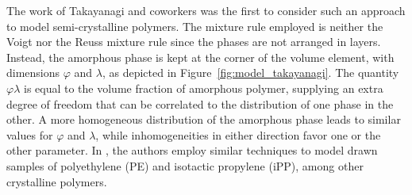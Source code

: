 The work of Takayanagi and coworkers \citep{takayanagiApplicationEquivalentModel1964} was the first to consider such an approach to model semi-crystalline polymers.
The mixture rule employed is neither the Voigt nor the Reuss mixture rule since the phases are not arranged in layers.
Instead, the amorphous phase is kept at the corner of the volume element, with dimensions $\varphi$ and $\lambda$, as depicted in Figure~\ref{fig:model_takayanagi}.
The quantity $\varphi \lambda$ is equal to the volume fraction of amorphous polymer, supplying an extra degree of freedom that can be correlated to the distribution of one phase in the other.
A more homogeneous distribution of the amorphous phase leads to similar values for $\varphi$ and $\lambda$, while inhomogeneities in either direction favor one or the other parameter.
In \cite{takayanagiMechanicalPropertiesFine1967}, the authors employ similar techniques to model drawn samples of polyethylene (PE) and isotactic propylene (iPP), among other crystalline polymers.
